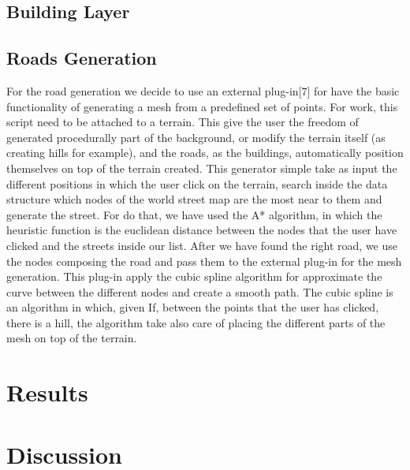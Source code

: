 \documentclass[conference]{IEEEtran}
\begin{document}
\subsection{Building Layer}


\subsection{Roads Generation}

For the road generation we decide to use an external plug-in[7] for have the basic functionality of generating a mesh from a predefined set of points. For work, this script need to be attached to a terrain. This give the user the freedom of generated procedurally part of the background, or modify the terrain itself (as creating hills for example), and the roads, as the buildings, automatically position themselves on top of the terrain created. This generator simple take as input the different positions in which the user click on the terrain, search inside the data structure which nodes of the world street map are the most near to them and generate the street. For do that, we have used the A* algorithm, in which the heuristic function is the euclidean distance between the nodes that the user have clicked and the streets inside our list. After we have found the right road, we use the nodes composing the road and pass them to the external plug-in for the mesh generation. This plug-in apply the cubic spline algorithm for approximate the curve between the different nodes and create a smooth path. The cubic spline is an algorithm in which, given  If, between the points that the user has clicked, there is a hill, the algorithm take also care of placing the different parts of the mesh on top of the terrain. 



\section{Results}

\section{Discussion}
\end{document}

